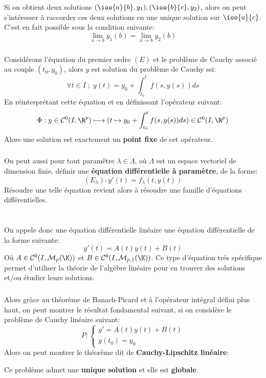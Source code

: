 \subsection*{}
Si on obtient deux solutions \( ( \ioo{a}{b}, y_1), (\ioo{b}{c}, y_2) \), alors on peut s'intéresser à raccorder ces deux solutions en une unique solution sur \( \ioo{a}{c} \). C'est en fait possible sous la condition suivante:
\[ 
   \lim_{x \rightarrow b} y_1(b) = \lim_{x \rightarrow b} y_2(b)
\]
\subsection*{}
Considérons l'équation du premier ordre \((E)\) et le problème de Cauchy associé au couple \( (t_0, y_0) \), alors \( y \) est solution du problème de Cauchy ssi:
\[ 
   \forall t \in I \; ; \; y(t) = y_0 + \int_{t_0}^t f(s, y(s))ds 
\]
En réinterprétant cette équation et en définissant l'opérateur suivant:
\[ 
   \Phi : y \in \mathcal{C}^0(I, \R^p) \longmapsto (t \mapsto y_0 + \int_{t_0}^t f(s, y(s))ds) \in \mathcal{C}^0(I, \R^p)
\]
Alors une solution est exactement un \textbf{point fixe} de cet opérateur.

\subsection*{}
On peut aussi pour tout paramêtre \( \lambda \in \Lambda \), où \( \Lambda \) est un espace vectoriel de dimension finie, définir une \textbf{équation différentielle à paramètre}, de la forme:
\[ 
   (E_\lambda) : y'(t) = f_\lambda(t, y(t)) 
\]
Résoudre une telle équation revient alors à résoudre une famille d'équations différentielles.
\chapter*{}
On appele donc une équation différentielle linéaire une équation différentielle de la forme suivante:
\[ 
   y'(t) = A(t)y(t) + B(t) 
\]
Où \(A \in \mathcal{C}^0(I, \mathcal{M}_p( \K))\) et \(B \in \mathcal{C}^0(I, \mathcal{M}_{p, 1}( \K))\). Ce type d'équation trés spécifique permet d'utiliser la théorie de l'algèbre linéaire pour en trouver des solutions et/ou étudier leurs solutions.
\subsection*{}
Alors gràce au théorème de Banach-Picard et à l'opérateur intégral défini plus haut, on peut montrer le résultat fondamental suivant, si on considère le problème de Cauchy linéaire suivant:
\[ 
   P: \begin{cases}
      y' = A(t)y(t) + B(t)\\
      y(t_0) = y_0
   \end{cases} 
\]
Alors on peut montrer le théorème dit de \textbf{Cauchy-Lipschitz linéaire}:
\begin{center}
   Ce problème admet une \textbf{unique solution} et elle est \textbf{globale}.
\end{center}
